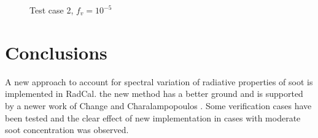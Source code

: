 \documentclass[3p]{elsarticle}
\begin{document}
\begin{figure}[p]
	\centering{}
	\par\medskip		
	\centering{}
	\caption{Test case 2, \({f_v=10^{-5}}\)} \label{fig:m_s5}
\end{figure}

\pagebreak

\section{Conclusions}
A new approach to account for spectral variation of radiative properties of soot is implemented in RadCal. the new method has a better ground and is supported by a newer work of Change and Charalampopoulos \cite{ChangeCharalampopoulos1990}. Some verification cases have been tested and the clear effect of new implementation in cases with moderate soot concentration was observed.


 
\end{document}
